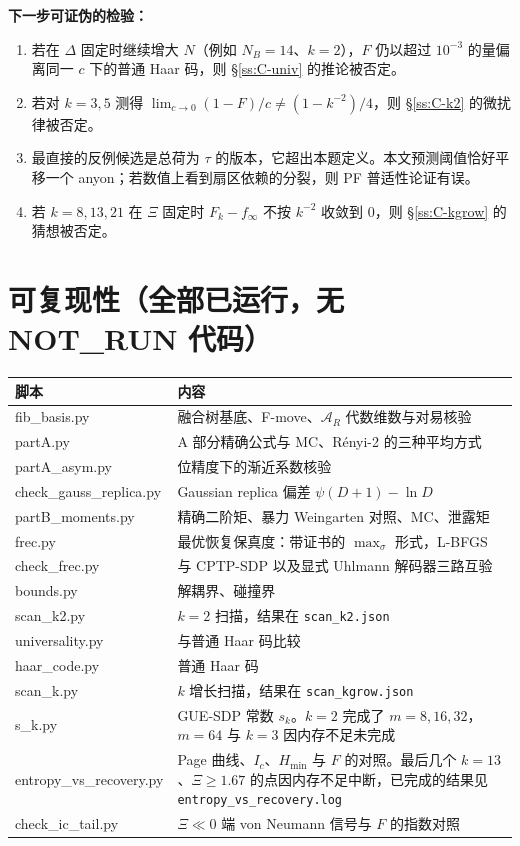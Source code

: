 \documentclass[11pt,a4paper,UTF8]{ctexart}
\newcommand{\code}[1]{\texttt{#1}}
\begin{document}
\noindent\textbf{下一步可证伪的检验：}
\begin{enumerate}[label=(\alph*)]
  \item 若在 $\Delta$ 固定时继续增大 $N$（例如 $N_B=14$、$k=2$），$F$ 仍以超过 $10^{-3}$ 的量偏离同一 $c$ 下的普通 Haar 码，则 \S\ref{ss:C-univ} 的推论被否定。
  \item 若对 $k=3,5$ 测得 $\lim_{c\to0}(1-F)/c\ne(1-k^{-2})/4$，则 \S\ref{ss:C-k2} 的微扰律被否定。
  \item 最直接的反例候选是总荷为 $\tau$ 的版本，它超出本题定义。本文预测阈值恰好平移一个 anyon；若数值上看到扇区依赖的分裂，则 PF 普适性论证有误。
  \item 若 $k=8,13,21$ 在 $\Xi$ 固定时 $F_k-f_\infty$ 不按 $k^{-2}$ 收敛到 0，则 \S\ref{ss:C-kgrow} 的猜想被否定。
\end{enumerate}

\section{可复现性（全部已运行，无 NOT\_RUN 代码）}\label{sec:repro}

\noindent\begin{minipage}{\textwidth}\centering\small
\captionof{table}{脚本清单（位于 \code{q2\_work/}）}
\begin{tabularx}{\textwidth}{>{\ttfamily}l>{\raggedright\arraybackslash}X}
\toprule
\normalfont 脚本 & 内容\\
\midrule
fib\_basis.py & 融合树基底、F-move、$\mathcal A_R$ 代数维数与对易核验\\
partA.py & A 部分精确公式与 MC、Rényi-2 的三种平均方式\\
partA\_asym.py & 40 位精度下的渐近系数核验\\
check\_gauss\_replica.py & Gaussian replica 偏差 $\psi(D+1)-\ln D$\\
partB\_moments.py & 精确二阶矩、暴力 Weingarten 对照、MC、泄露矩\\
frec.py & 最优恢复保真度：带证书的 $\max_\sigma$ 形式，L-BFGS\\
check\_frec.py & 与 CPTP-SDP 以及显式 Uhlmann 解码器三路互验\\
bounds.py & 解耦界、碰撞界\\
scan\_k2.py & $k=2$ 扫描，结果在 \code{scan\_k2.json}\\
universality.py & 与普通 Haar 码比较\\
haar\_code.py & 普通 Haar 码\\
scan\_k.py & $k$ 增长扫描，结果在 \code{scan\_kgrow.json}\\
s\_k.py & GUE-SDP 常数 $s_k$。$k=2$ 完成了 $m=8,16,32$，$m=64$ 与 $k=3$ 因内存不足未完成\\
entropy\_vs\_recovery.py & Page 曲线、$I_c$、$H_{\min}$ 与 $F$ 的对照。最后几个 $k=13$、$\Xi\ge1.67$ 的点因内存不足中断，已完成的结果见 \code{entropy\_vs\_recovery.log}\\
check\_ic\_tail.py & $\Xi\ll0$ 端 von Neumann 信号与 $F$ 的指数对照\\
\bottomrule
\end{tabularx}
\end{minipage}
\medskip
\end{document}
